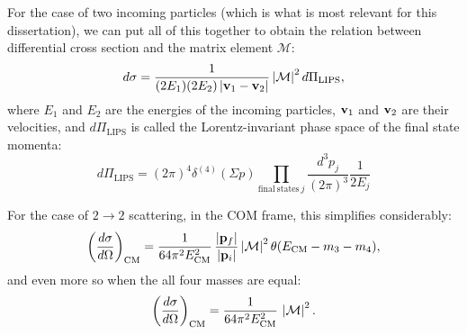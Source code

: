 For the case of two incoming particles (which is what is most relevant for this dissertation), we can put all of this together to obtain the relation between differential cross section and the matrix element $\mathcal M$:
\begin{equation}
	\label{eq:01_qft_interactions_cross_section_matrix_element}
	d\sigma = \frac{1}{(2E_1)(2E_2)\left\lvert \mathbf{v}_1 - \mathbf{v}_2 \right\rvert} \left\lvert \mathcal M \right\rvert^2 d\Pi_{\mathrm{LIPS}},
\end{equation}
where $E_1$ and $E_2$ are the energies of the incoming particles, $\mathbf{v}_1$ and $\mathbf{v}_2$ are their velocities, and $d\Pi_{\mathrm{LIPS}}$ is called the Lorentz-invariant phase space of the final state momenta:
\begin{equation}
	\label{eq:01_qft_interactions_cross_section_lips}
	d\Pi_{\mathrm{LIPS}} = (2\pi)^4 \delta^{(4)}(\Sigma p) \prod_{\mathrm{final\ states}\ j} \frac{d^3p_j}{(2\pi)^3} \frac{1}{2E_j}
\end{equation}

For the case of $2 \rightarrow 2$ scattering, in the COM frame, this simplifies considerably:
\begin{equation}
	\label{eq:01_qft_interactions_cross_section_com}
	\bigg(\frac{d\sigma}{d\Omega}\bigg)_{\mathrm{CM}} = \frac{1}{64\pi^2E_{\mathrm{CM}}^2}\, \frac{\left\lvert \mathbf{p}_f \right\rvert}{\left\lvert \mathbf{p}_i \right\rvert} \left\lvert \mathcal M \right\rvert^2 \theta(E_{\mathrm{CM}} - m_3 - m_4),
\end{equation}
and even more so when the all four masses are equal:
\begin{equation}
	\label{eq:01_qft_interactions_cross_section_com_equal_mass}
	\bigg(\frac{d\sigma}{d\Omega}\bigg)_{\mathrm{CM}} = \frac{1}{64\pi^2E_{\mathrm{CM}}^2}\, \left\lvert \mathcal M \right\rvert^2.
\end{equation}


